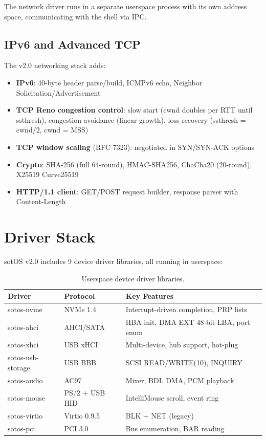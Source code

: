 \documentclass[11pt,letterpaper]{article}
\theoremstyle{definition}
\begin{document}
The network driver runs in a separate userspace process with its own address
space, communicating with the shell via IPC.

\subsection{IPv6 and Advanced TCP}

The v2.0 networking stack adds:
\begin{itemize}[nosep]
    \item \textbf{IPv6}: 40-byte header parse/build, ICMPv6 echo, Neighbor Solicitation/Advertisement
    \item \textbf{TCP Reno congestion control}: slow start (cwnd doubles per RTT until ssthresh),
          congestion avoidance (linear growth), loss recovery (ssthresh = cwnd/2, cwnd = MSS)
    \item \textbf{TCP window scaling} (RFC 7323): negotiated in SYN/SYN-ACK options
    \item \textbf{Crypto}: SHA-256 (full 64-round), HMAC-SHA256, ChaCha20 (20-round), X25519 Curve25519
    \item \textbf{HTTP/1.1 client}: GET/POST request builder, response parser with Content-Length
\end{itemize}

\section{Driver Stack}
\label{sec:drivers}

sotOS v2.0 includes 9 device driver libraries, all running in userspace:

\begin{table}[h]
\centering
\begin{tabular}{lll}
\toprule
\textbf{Driver} & \textbf{Protocol} & \textbf{Key Features} \\
\midrule
sotos-nvme & NVMe 1.4 & Interrupt-driven completion, PRP lists \\
sotos-ahci & AHCI/SATA & HBA init, DMA EXT 48-bit LBA, port enum \\
sotos-xhci & USB xHCI & Multi-device, hub support, hot-plug \\
sotos-usb-storage & USB BBB & SCSI READ/WRITE(10), INQUIRY \\
sotos-audio & AC97 & Mixer, BDL DMA, PCM playback \\
sotos-mouse & PS/2 + USB HID & IntelliMouse scroll, event ring \\
sotos-virtio & Virtio 0.9.5 & BLK + NET (legacy) \\
sotos-pci & PCI 3.0 & Bus enumeration, BAR reading \\
\bottomrule
\end{tabular}
\caption{Userspace device driver libraries.}
\end{table}
\end{document}
